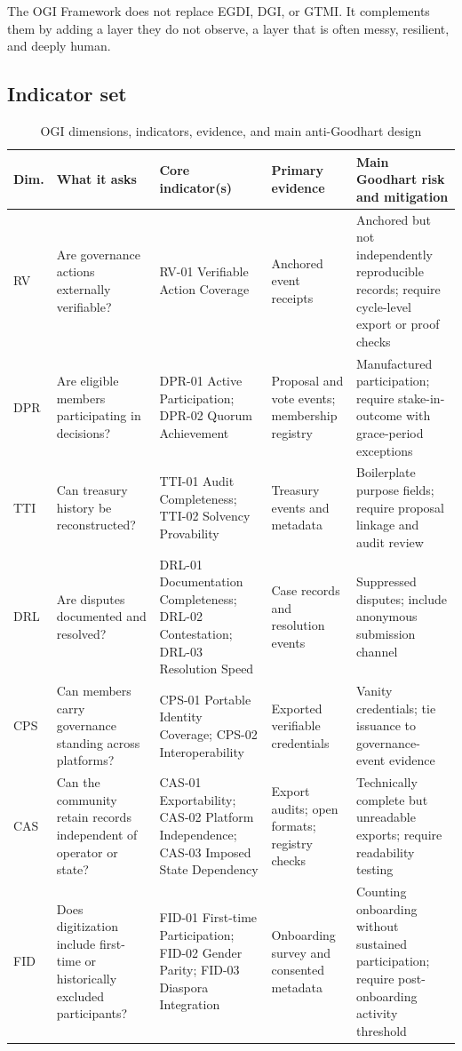 \documentclass[sigconf,anonymous]{acmart}
\begin{document}
The OGI Framework does not replace EGDI, DGI, or GTMI. It complements them by adding a layer they do not observe, a layer that is often messy, resilient, and deeply human.

\subsection{Indicator set}

\begin{table}[t]
\caption{OGI dimensions, indicators, evidence, and main anti-Goodhart design}
\label{tab:ogi}
\small
\begin{tabularx}{\textwidth}{>{\raggedright\arraybackslash}p{0.7cm} >{\raggedright\arraybackslash}p{2.6cm} >{\raggedright\arraybackslash}p{3.2cm} >{\raggedright\arraybackslash}p{2.7cm} Y}
\toprule
Dim. & What it asks & Core indicator(s) & Primary evidence & Main Goodhart risk and mitigation \\
\midrule
RV & Are governance actions externally verifiable? & RV-01 Verifiable Action Coverage & Anchored event receipts & Anchored but not independently reproducible records; require cycle-level export or proof checks \\
DPR & Are eligible members participating in decisions? & DPR-01 Active Participation; DPR-02 Quorum Achievement & Proposal and vote events; membership registry & Manufactured participation; require stake-in-outcome with grace-period exceptions \\
TTI & Can treasury history be reconstructed? & TTI-01 Audit Completeness; TTI-02 Solvency Provability & Treasury events and metadata & Boilerplate purpose fields; require proposal linkage and audit review \\
DRL & Are disputes documented and resolved? & DRL-01 Documentation Completeness; DRL-02 Contestation; DRL-03 Resolution Speed & Case records and resolution events & Suppressed disputes; include anonymous submission channel \\
CPS & Can members carry governance standing across platforms? & CPS-01 Portable Identity Coverage; CPS-02 Interoperability & Exported verifiable credentials & Vanity credentials; tie issuance to governance-event evidence \\
CAS & Can the community retain records independent of operator or state? & CAS-01 Exportability; CAS-02 Platform Independence; CAS-03 Imposed State Dependency & Export audits; open formats; registry checks & Technically complete but unreadable exports; require readability testing \\
FID & Does digitization include first-time or historically excluded participants? & FID-01 First-time Participation; FID-02 Gender Parity; FID-03 Diaspora Integration & Onboarding survey and consented metadata & Counting onboarding without sustained participation; require post-onboarding activity threshold \\
\bottomrule
\end{tabularx}
\end{table}
\end{document}
